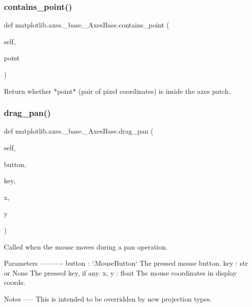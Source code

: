 \subsubsection{\texorpdfstring{contains\+\_\+point()}{contains\_point()}}
{\footnotesize\ttfamily def matplotlib.\+axes.\+\_\+base.\+\_\+\+Axes\+Base.\+contains\+\_\+point (\begin{DoxyParamCaption}\item[{}]{self,  }\item[{}]{point }\end{DoxyParamCaption})}

\begin{DoxyVerb}Return whether *point* (pair of pixel coordinates) is inside the axes
patch.
\end{DoxyVerb}
 \mbox{\label{classmatplotlib_1_1axes_1_1__base_1_1__AxesBase_a05aa8b811347f35ff1d4425d765be107}} 
\subsubsection{\texorpdfstring{drag\+\_\+pan()}{drag\_pan()}}
{\footnotesize\ttfamily def matplotlib.\+axes.\+\_\+base.\+\_\+\+Axes\+Base.\+drag\+\_\+pan (\begin{DoxyParamCaption}\item[{}]{self,  }\item[{}]{button,  }\item[{}]{key,  }\item[{}]{x,  }\item[{}]{y }\end{DoxyParamCaption})}

\begin{DoxyVerb}Called when the mouse moves during a pan operation.

Parameters
----------
button : `.MouseButton`
    The pressed mouse button.
key : str or None
    The pressed key, if any.
x, y : float
    The mouse coordinates in display coords.

Notes
-----
This is intended to be overridden by new projection types.
\end{DoxyVerb}
 \mbox{\label{classmatplotlib_1_1axes_1_1__base_1_1__AxesBase_a17c358afc5008f7677a753b2b1e72741}} 
